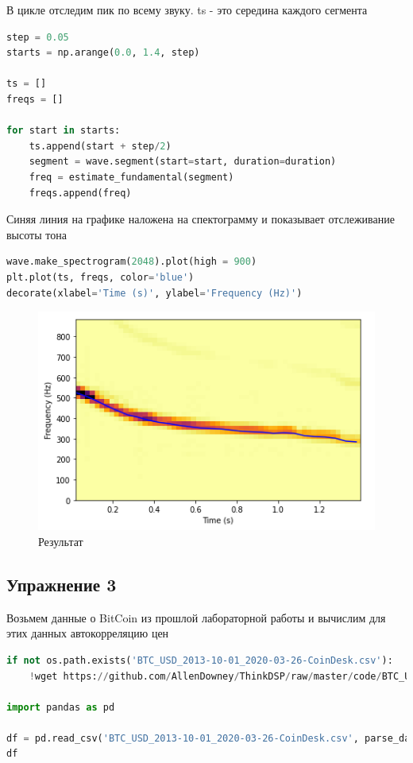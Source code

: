 В цикле отследим пик по всему звуку. ts - это середина каждого сегмента

\begin{lstlisting}[language=Python]
step = 0.05
starts = np.arange(0.0, 1.4, step)

ts = []
freqs = []

for start in starts:
    ts.append(start + step/2)
    segment = wave.segment(start=start, duration=duration)
    freq = estimate_fundamental(segment)
    freqs.append(freq)
\end{lstlisting}

Синяя линия на графике наложена на спектограмму и показывает отслеживание высоты тона

\begin{lstlisting}[language=Python]
wave.make_spectrogram(2048).plot(high = 900)
plt.plot(ts, freqs, color='blue')
decorate(xlabel='Time (s)', ylabel='Frequency (Hz)')
\end{lstlisting}

\begin{figure}[H]
	\begin{center}
		\includegraphics[scale=1]{fig/lab05/lab05_04.png}
		\caption{Результат}
	\end{center}
\end{figure}


\subsection{Упражнение 3}

Возьмем данные о BitCoin из прошлой лабораторной работы и вычислим для этих данных автокорреляцию цен

\begin{lstlisting}[language=Python]
if not os.path.exists('BTC_USD_2013-10-01_2020-03-26-CoinDesk.csv'):
    !wget https://github.com/AllenDowney/ThinkDSP/raw/master/code/BTC_USD_2013-10-01_2020-03-26-CoinDesk.csv
    
import pandas as pd

df = pd.read_csv('BTC_USD_2013-10-01_2020-03-26-CoinDesk.csv', parse_dates=[0])
df

\end{lstlisting}

